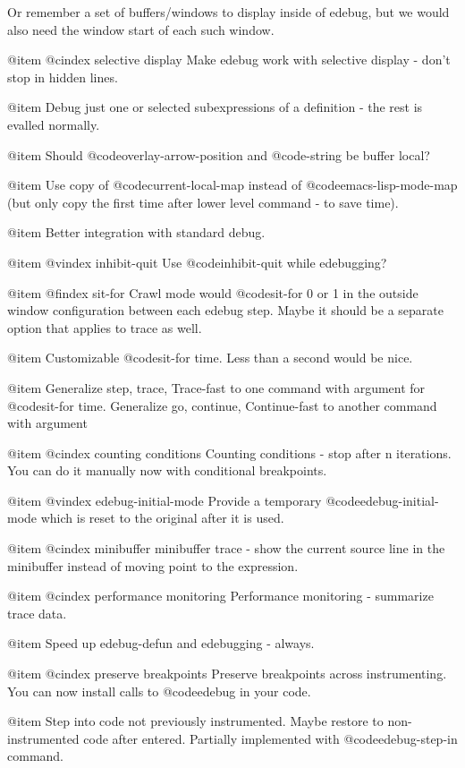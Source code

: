 Or remember a set of buffers/windows to display inside of edebug, but we
would also need the window start of each such window.

@item
@cindex selective display
Make edebug work with selective display - don't stop in hidden lines.

@item
Debug just one or selected subexpressions of a definition - the rest is
evalled normally.

@item
Should @code{overlay-arrow-position} and @code{-string} be buffer local?

@item
Use copy of @code{current-local-map} instead of @code{emacs-lisp-mode-map}
(but only copy the first time after lower level command - to save time).

@item
Better integration with standard debug.

@item
@vindex inhibit-quit
Use @code{inhibit-quit} while edebugging?  

@item
@findex sit-for
Crawl mode would @code{sit-for} 0 or 1 in the outside window configuration
between each edebug step.
Maybe it should be a separate option that applies to trace as well.

@item
Customizable @code{sit-for} time.  Less than a second would be nice.

@item
Generalize step, trace, Trace-fast to one command with argument for
@code{sit-for} time.
Generalize go, continue, Continue-fast to another command with argument

@item
@cindex counting conditions
Counting conditions - stop after n iterations.  You can do it manually now
with conditional breakpoints.

@item
@vindex edebug-initial-mode
Provide a temporary @code{edebug-initial-mode} which is reset to the
original after it is used.

@item
@cindex minibuffer
minibuffer trace - show the current source line in the minibuffer instead
of moving point to the expression.

@item
@cindex performance monitoring
Performance monitoring - summarize trace data.

@item
Speed up edebug-defun and edebugging - always.

@item
@cindex preserve breakpoints
Preserve breakpoints across instrumenting.
You can now install calls to @code{edebug} in your code.

@item
Step into code not previously instrumented.
Maybe restore to non-instrumented code after entered.
Partially implemented with @code{edebug-step-in} command.

